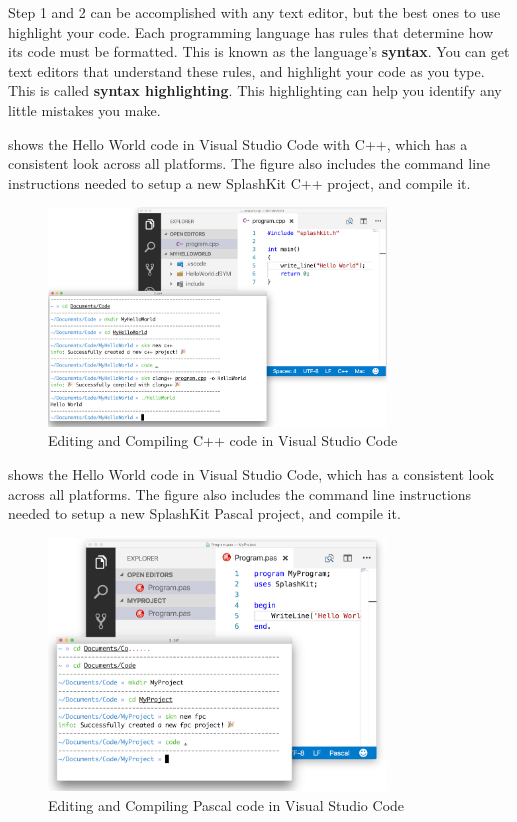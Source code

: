 Step 1 and 2 can be accomplished with any text editor, but the best ones to use highlight your code. Each programming language has rules that determine how its code must be formatted. This is known as the language's \textbf{syntax}. You can get text editors that understand these rules, and highlight your code as you type. This is called \textbf{syntax highlighting}. This highlighting can help you identify any little mistakes you make. 

 shows the Hello World code in Visual Studio Code with C++, which has a consistent look across all platforms. The figure also includes the command line instructions needed to setup a new SplashKit C++ project, and compile it.

\begin{figure}[h]
   \centering
   \includegraphics[width=0.8\textwidth]{./topics/programs-and-compilers/images/CppExample} 
   \caption{Editing and Compiling C++ code in Visual Studio Code}
   \label{fig:cpp-example}
\end{figure}

 shows the Hello World code in Visual Studio Code, which has a consistent look across all platforms. The figure also includes the command line instructions needed to setup a new SplashKit Pascal project, and compile it.

\begin{figure}[h]
   \centering
   \includegraphics[width=0.8\textwidth]{./topics/programs-and-compilers/images/FpcExample} 
   \caption{Editing and Compiling Pascal code in Visual Studio Code}
   \label{fig:fpc-example}
\end{figure}

